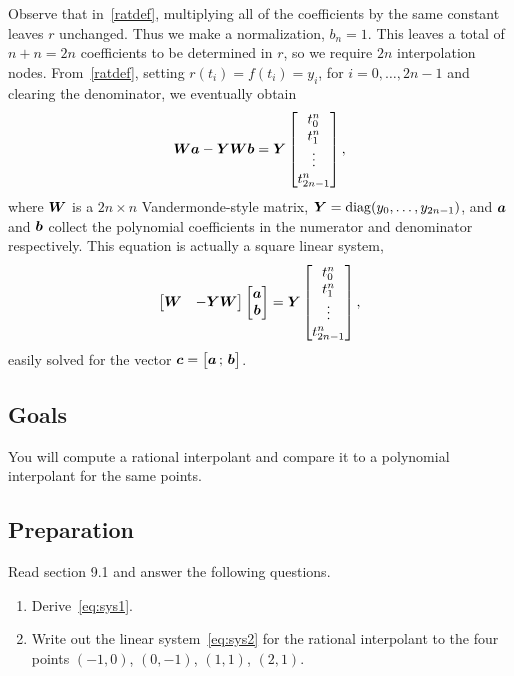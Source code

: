 \documentclass[11pt,twoside]{article}
\begin{document}
Observe that in~\eqref{ratdef}, multiplying all of the coefficients by the same constant leaves $r$ unchanged. Thus we make a normalization, $b_n=1$. This leaves a total of $n+n=2n$ coefficients to be determined in $r$, so we require $2n$ interpolation nodes. From~\eqref{ratdef}, setting $r(t_i)=f(t_i)=y_i$, for $i=0,\ldots,2n-1$ and clearing the denominator, we eventually obtain
\begin{equation}
\label{eq:sys1}
\bm{W} \bm{a} - \bm{Y} \bm{W} \bm{b} = \bm{Y} 
\begin{bmatrix}
 t_0^n \\ t_1^n \\ \vdots \\ t_{2n-1}^n
\end{bmatrix},
\end{equation}
where $\bm{W}$ is a $2n\times n$ Vandermonde-style matrix, 
$\bm{Y}=\operatorname{diag}(y_0,\ldots,y_{2n-1})$, and $\bm{a}$ and $\bm{b}$ collect the polynomial coefficients in the numerator and denominator respectively. This equation is actually a square linear system,
\begin{equation}
  \label{eq:sys2}
\begin{bmatrix}
  \bm{W} & - \bm{Y} \bm{W} 
\end{bmatrix}
\begin{bmatrix}
\bm{a} \\ \bm{b}
\end{bmatrix}
= \bm{Y} 
\begin{bmatrix}
t_0^n \\ t_1^n \\ \vdots \\ t_{2n-1}^n
\end{bmatrix},
\end{equation}
easily solved for the vector $\bm{c} = \bigl[ \bm{a}\,; \, \bm{b} \bigr]$. 

\subsection*{Goals}

You will compute a rational interpolant and compare it to a polynomial interpolant for the same points. 

\subsection*{Preparation}

Read section 9.1 and answer the following questions.

\begin{enumerate}
    \item Derive~\eqref{eq:sys1}.
    \item Write out the linear system~\eqref{eq:sys2} for the rational interpolant to the four points $(-1,0)$, $(0,-1)$, $(1,1)$, $(2,1)$. 
\end{enumerate}
\end{document}

